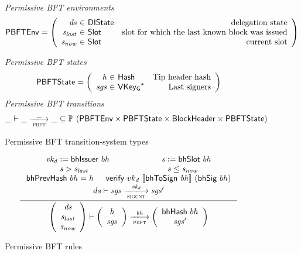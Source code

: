 \documentclass[11pt,a4paper]{article}
\newcommand{\powerset}[1]{\mathbb{P}~#1}
\newcommand{\var}[1]{\mathit{#1}}
\newcommand{\fun}[1]{\mathsf{#1}}
\newcommand{\type}[1]{\mathsf{#1}}
\newcommand{\trans}[2]{\xlongrightarrow[\textsc{#1}]{#2}}
\newcommand{\seqof}[1]{#1^{*}}
\newcommand{\serialised}[1]{\llbracket \var{#1} \rrbracket}
\newcommand{\leteq}{\ensuremath{\mathrel{\mathop:}=}}
\newcommand{\Hash}{\type{Hash}}  %
\newcommand{\Slot}{\type{Slot}}
\newcommand{\VKeyGen}{\type{VKey_G}}
\newcommand{\DelegState}{\type{DIState}}
\newcommand{\verifyname}{verify}
\newcommand{\bhsigname}{bhSig}
\newcommand{\bhissuername}{bhIssuer}
\newcommand{\verify}[3]{\fun{\verifyname} ~ #1 ~ #2 ~ #3}
\newcommand{\bhsig}[1]{\fun{\bhsigname} ~ #1}
\newcommand{\bhissuer}[1]{\fun{\bhissuername} ~ #1}
\begin{document}
\begin{figure}[ht]
  \emph{Permissive BFT environments}
  \begin{equation*}
    \PBFTEnv =
    \left(
      \begin{array}{r@{~\in~}lr}
        \var{ds} & \DelegState & \text{delegation state} \\
        \var{s_{last}} & \Slot & \text{slot for which the last known block was issued} \\
        \var{s_{now}} & \Slot & \text{current slot} \\
      \end{array}
    \right)
  \end{equation*}

  \emph{Permissive BFT states}
  \begin{equation*}
    \PBFTState =
    \left(
      \begin{array}{r@{~\in~}lr}
        \var{h} & \Hash & \text{Tip header hash} \\
        \var{sgs} & \seqof{\VKeyGen} & \text{Last signers}
      \end{array}
    \right)
  \end{equation*}
  \emph{Permissive BFT transitions}
  \begin{equation*}
    \_ \vdash \var{\_} \trans{pbft}{\_} \var{\_} \subseteq
    \powerset (\PBFTEnv \times \PBFTState \times \Bhead \times \PBFTState)
  \end{equation*}
  \caption{Permissive BFT transition-system types}
  \label{fig:ts-types:pbft}
\end{figure}

\begin{figure}[ht]
  \begin{equation*}
    \inference
    {
      \var{vk_d} \leteq \bhissuer{bh} & \var{s} \leteq \bhslot{bh}
      \\ \var{s} > \var{s_{last}} & \var{s} \leq \var{s_{now}}
      \\ \bhprevhash{bh} = \var{h} & \verify{vk_d}{\serialised{\bhtosign{bh}}}{(\bhsig{bh})}
      \\
      ds
      \vdash
      \var{sgs} \trans{sigcnt}{\var{vk_d}} \var{sgs'}
      \\
    }
    {
      \left(
        {\begin{array}{c}
           \var{ds} \\
           \var{s_{last}} \\
           \var{s_{now}} \\
         \end{array}}
     \right)
     \vdash
     \left(
       {\begin{array}{c}
          \var{h} \\
          \var{sgs}
        \end{array}}
    \right)
    \trans{pbft}{\var{bh}}
    \left(
      {\begin{array}{c}
         \bhhash{bh} \\
         \var{sgs}'
       \end{array}}
   \right)
 }
\end{equation*}
\caption{Permissive BFT rules}
\label{fig:rules:pbft}
\end{figure}
\end{document}
